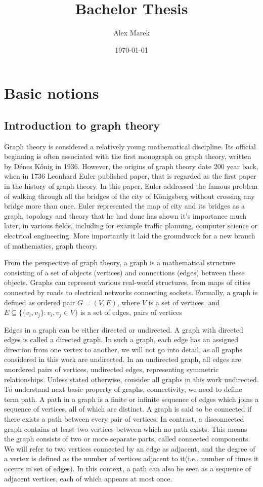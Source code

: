 \documentclass[12pt]{article}
\title{Bachelor Thesis}
\author{Alex Marek}
\date{\today}
\begin{document}
	
	\maketitle
	
	\section{Basic notions}
				
	\subsection{Introduction to graph theory}
		Graph theory is considered a relatively young mathematical discipline. Its official beginning is often associated with the first monograph on graph theory, written by Dénes Kőnig in 1936. However, the origins of graph theory date 200 year back, when in 1736 Leonhard Euler published paper, that is regarded as the first paper in the history of graph theory. In this paper, Euler addressed the famous problem of walking through all the bridges of the city of Königsberg without crossing any bridge more than once. Euler represented the map of city and its bridges as a graph, topology and theory that he had done has shown it's importance much later, in various fields, including for example traffic planning, computer science or electrical engineering. More importantly it laid the groundwork for a new branch of mathematics, graph theory.
		
		From the perspective of graph theory, a graph is a mathematical structure consisting of a set of objects (vertices) and connections (edges) between these objects.
 		Graphs can represent various real-world structures, from maps of cities connected by roads to electrical networks connecting sockets.
		Formally, a graph is defined as ordered pair \( G = (V, E) \), where \( V \) is a set of vertices, and \( E \subseteq \{\{v_i, v_j\} : v_i, v_j \in V\} \) is a set of edges, pairs of vertices
		
		Edges in a graph can be either directed or undirected. A graph with directed edges is called a directed graph. In such a graph, each edge has an assigned direction from one vertex to another, we will not go into detail, as all graphs considered in this work are undirected. In an undirected graph, all edges are unordered pairs of vertices, undirected edges, representing symmetric relationships. Unless stated otherwise, consider all graphs in this work undirected.
		To understand next basic property of graphs, connectivity, we need to define term path. A path in a graph is a finite or infinite sequence of edges which joins a sequence of vertices, all of which are distinct. A graph is said to be connected if there exists a path between every pair of vertices.	In contrast, a disconnected graph contains at least two vertices between which no path exists. This means the graph consists of two or more separate parts, called connected components. 
		We will refer to two vertices connected by an edge as adjacent, and the degree of a vertex is defined as the number of vertices adjacent to it(i.e., number of times it occurs in set of edges). In this context, a path can also be seen as a sequence of adjacent vertices, each of which appears at most once.
	
\end{document}
